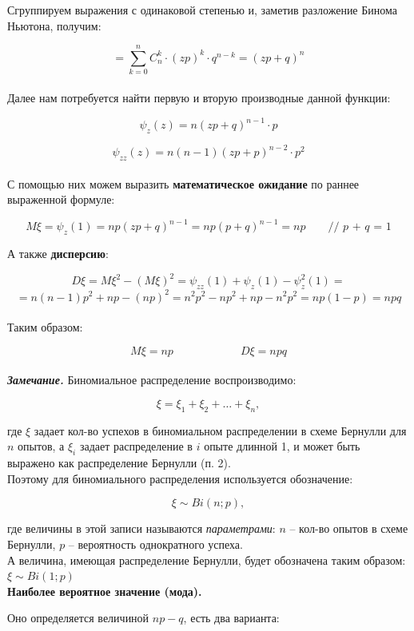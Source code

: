 \documentclass{article}
\begin{document}
\begin{enumerate}
Сгруппируем выражения с одинаковой степенью и, заметив разложение Бинома Ньютона, получим:

$$= \sum\limits_{k = 0}^n C_n^k \cdot (zp)^k \cdot q^{n - k} = (zp + q)^n$$
\\

Далее нам потребуется найти первую и вторую производные данной функции:

$$\psi_z(z) = n(zp + q)^{n - 1} \cdot p$$

$$\psi_{zz}(z) = n(n - 1)(zp + p)^{n - 2}\cdot p^2$$
\\

С помощью них можем выразить \textbf{математическое ожидание} по раннее выраженной формуле:

$$M\xi = \psi_z(1) = np(zp + q)^{n - 1} = np(p + q)^{n - 1} = np 
\qquad \textit{// p + q = 1}$$

А также \textbf{дисперсию}:

$$D\xi = M\xi^2 - (M\xi)^2 = \psi_{zz}(1) + \psi_z(1) - \psi_z^2(1) =$$ 
$$ = n(n - 1)p^2 + np - (np)^2 = n^2p^2 - np^2 + np - n^2p^2 = np(1 - p) = npq$$
\\

Таким образом:

$$M\xi = np \qquad\qquad\qquad D\xi = npq$$
\\

\textit{\textbf{Замечание.}} Биномиальное распределение воспроизводимо:

$$\xi = \xi_1 + \xi_2 + \ldots + \xi_n,$$

где $\xi$ задает кол-во успехов в биномиальном распределении в схеме Бернулли для $n$ опытов,
а $\xi_i$ задает распределение в $i$ опыте длинной 1, и может быть выражено как распределение Бернулли (п. 2).
\\

Поэтому для биномиального распределения используется обозначение:

$$\xi \sim Bi(n; p),$$

где величины в этой записи называются \textit{параметрами}: $n$ -- кол-во опытов в схеме Бернулли, $p$ -- вероятность однократного успеха.
\\

А величина, имеющая распределение Бернулли, будет обозначена таким образом: $\xi \sim Bi(1; p)$
\\



\textbf{Наиболее вероятное значение (мода).}

Оно определяется величиной $np - q$, есть два варианта:


\end{enumerate}
\end{document}
